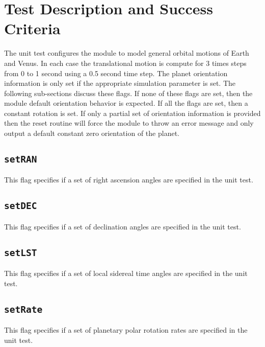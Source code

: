 
\section{Test Description and Success Criteria}
The unit test configures the module to model general orbital motions of Earth and Venus.  In each case the translational motion is compute for 3 times steps from 0 to 1 second using a 0.5 second time step.  The planet orientation information is only set if the appropriate simulation parameter is set.  The following sub-sections discuss these flags.  If none of these flags are set, then the module default orientation behavior is expected.  If all the flags are set, then a constant rotation is set.  If only a partial set of orientation information is provided then the reset routine will force the module to throw an error message and only output a default constant zero orientation of the planet. 

\subsection{{\tt setRAN}}
This flag specifies if a set of right ascension angles are specified in the unit test.

\subsection{{\tt setDEC}}
This flag specifies if a set of declination angles are specified in the unit test.

\subsection{{\tt setLST}}
This flag specifies if a set of local sidereal time angles are specified in the unit test.

\subsection{{\tt setRate}}
This flag specifies if a set of planetary polar rotation rates are specified in the unit test.




